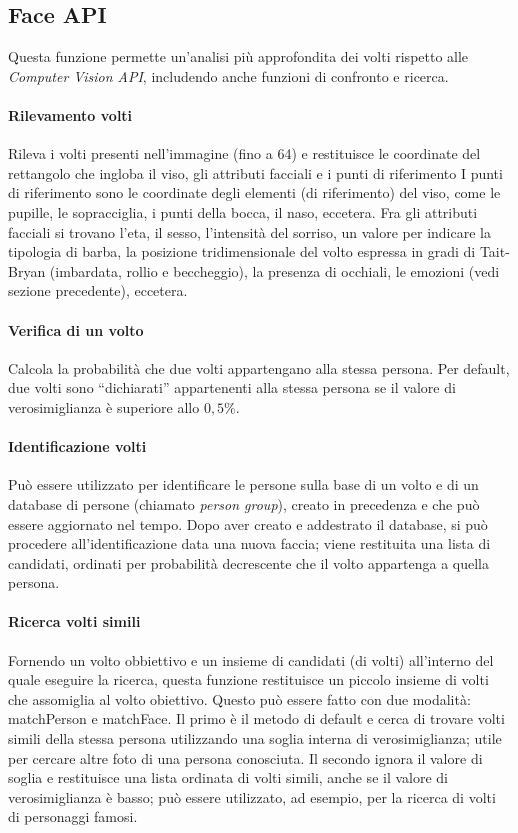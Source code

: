 \subsection{Face API}
Questa funzione permette un'analisi più approfondita dei volti rispetto alle \textit{Computer Vision API}, includendo anche funzioni di confronto e ricerca.

\paragraph{Rilevamento volti} Rileva i volti presenti nell'immagine (fino a 64) e restituisce le coordinate del rettangolo che ingloba il viso, gli attributi facciali
e i punti di riferimento
I punti di riferimento sono le coordinate degli elementi (di riferimento) del viso, come le pupille, le sopracciglia, i punti della bocca, il naso, eccetera.
Fra gli attributi facciali si trovano l'eta, il sesso, l'intensità del sorriso, un valore per indicare la tipologia di barba, la posizione tridimensionale del volto
espressa in gradi di Tait-Bryan (imbardata, rollio e beccheggio), la presenza di occhiali, le emozioni (vedi sezione precedente), eccetera.

\paragraph{Verifica di un volto} Calcola la probabilità che due volti appartengano alla stessa persona.
Per default, due volti sono ``dichiarati'' appartenenti alla stessa persona se il valore di verosimiglianza è superiore allo $0,5\%$.

\paragraph{Identificazione volti} Può essere utilizzato per identificare le persone sulla base di un volto e di un database di persone (chiamato \textit{person group}),
creato in precedenza e che può essere aggiornato nel tempo.
Dopo aver creato e addestrato il database, si può procedere all'identificazione data una nuova faccia;
viene restituita una lista di candidati, ordinati per probabilità decrescente che il volto appartenga a quella persona.

\paragraph{Ricerca volti simili} Fornendo un volto obbiettivo e un insieme di candidati (di volti) all'interno del quale eseguire la ricerca,
questa funzione restituisce un piccolo insieme di volti che assomiglia al volto obiettivo.
Questo può essere fatto con due modalità: \textsf{matchPerson} e \textsf{matchFace}.
Il primo è il metodo di default e cerca di trovare volti simili della stessa persona utilizzando una soglia interna di verosimiglianza;
utile per cercare altre foto di una persona conosciuta.
Il secondo ignora il valore di soglia e restituisce una lista ordinata di volti simili, anche se il valore di verosimiglianza è basso;
può essere utilizzato, ad esempio, per la ricerca di volti di personaggi famosi.

